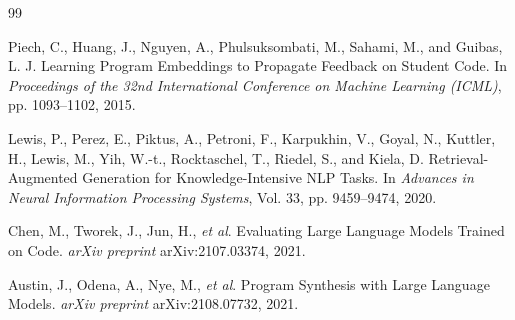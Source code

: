 \begin{thebibliography}{99}

Piech, C., Huang, J., Nguyen, A., Phulsuksombati, M., Sahami, M., and Guibas, L. J.
Learning Program Embeddings to Propagate Feedback on Student Code.
In \textit{Proceedings of the 32nd International Conference on Machine Learning (ICML)}, pp. 1093--1102, 2015.

Lewis, P., Perez, E., Piktus, A., Petroni, F., Karpukhin, V., Goyal, N., Kuttler, H., Lewis, M., Yih, W.-t., Rocktaschel, T., Riedel, S., and Kiela, D.
Retrieval-Augmented Generation for Knowledge-Intensive NLP Tasks.
In \textit{Advances in Neural Information Processing Systems}, Vol. 33, pp. 9459--9474, 2020.

Chen, M., Tworek, J., Jun, H., \textit{et al}.
Evaluating Large Language Models Trained on Code.
\textit{arXiv preprint} arXiv:2107.03374, 2021.

Austin, J., Odena, A., Nye, M., \textit{et al}.
Program Synthesis with Large Language Models.
\textit{arXiv preprint} arXiv:2108.07732, 2021.

\end{thebibliography}
